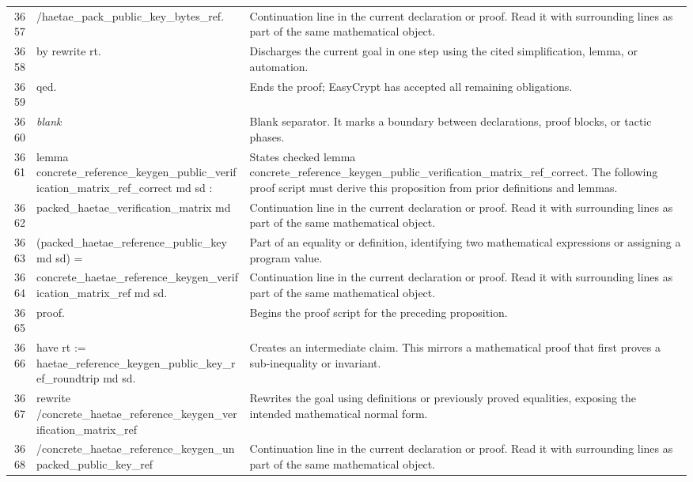 \documentclass[10pt]{article}
\begin{document}
\begin{longtable}{r L{0.53\textwidth} L{0.37\textwidth}}
3657 & {\ttfamily\scriptsize         /haetae\_pack\_public\_key\_bytes\_ref.} & Continuation line in the current declaration or proof.  Read it with surrounding lines as part of the same mathematical object. \\
3658 & {\ttfamily\scriptsize by rewrite rt.} & Discharges the current goal in one step using the cited simplification, lemma, or automation. \\
3659 & {\ttfamily\scriptsize qed.} & Ends the proof; EasyCrypt has accepted all remaining obligations. \\
3660 & {\ttfamily\scriptsize \emph{blank}} & Blank separator.  It marks a boundary between declarations, proof blocks, or tactic phases. \\
3661 & {\ttfamily\scriptsize lemma concrete\_reference\_keygen\_public\_verification\_matrix\_ref\_correct md sd :} & States checked lemma concrete\_reference\_keygen\_public\_verification\_matrix\_ref\_correct.  The following proof script must derive this proposition from prior definitions and lemmas. \\
3662 & {\ttfamily\scriptsize   packed\_haetae\_verification\_matrix md} & Continuation line in the current declaration or proof.  Read it with surrounding lines as part of the same mathematical object. \\
3663 & {\ttfamily\scriptsize     (packed\_haetae\_reference\_public\_key md sd) =} & Part of an equality or definition, identifying two mathematical expressions or assigning a program value. \\
3664 & {\ttfamily\scriptsize   concrete\_haetae\_reference\_keygen\_verification\_matrix\_ref md sd.} & Continuation line in the current declaration or proof.  Read it with surrounding lines as part of the same mathematical object. \\
3665 & {\ttfamily\scriptsize proof.} & Begins the proof script for the preceding proposition. \\
3666 & {\ttfamily\scriptsize have rt := haetae\_reference\_keygen\_public\_key\_ref\_roundtrip md sd.} & Creates an intermediate claim.  This mirrors a mathematical proof that first proves a sub-inequality or invariant. \\
3667 & {\ttfamily\scriptsize rewrite /concrete\_haetae\_reference\_keygen\_verification\_matrix\_ref} & Rewrites the goal using definitions or previously proved equalities, exposing the intended mathematical normal form. \\
3668 & {\ttfamily\scriptsize         /concrete\_haetae\_reference\_keygen\_unpacked\_public\_key\_ref} & Continuation line in the current declaration or proof.  Read it with surrounding lines as part of the same mathematical object. \\

\end{longtable}
\end{document}

